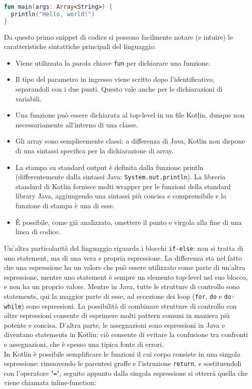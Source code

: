 \begin{lstlisting}[caption={Hello World}, captionpos=b, label={lst:exampleHelloWorld}, language=Kotlin]
fun main(args: Array<String>) {
  println("Hello, world!")
}
\end{lstlisting}

Da questo primo snippet di codice si possono facilmente notare (e intuire) le caratteristiche sintattiche principali del linguaggio:
\begin{itemize}
  \item Viene utilizzata la parola chiave \texttt{fun} per dichiarare una funzione.
  \item Il tipo del parametro in ingresso viene scritto dopo l’identificativo, separandoli con i due punti. Questo vale anche per le dichiarazioni di variabili.
  \item Una funzione può essere dichiarata al top-level in un file Kotlin, dunque non necessariamente all’interno di una classe.
  \item Gli array sono semplicemente classi: a differenza di Java, Kotlin non dispone di una sintassi specifica per la dichiarazione di array.
  \item La stampa su standard output è definita dalla funzione println (differentemente dalla sintassi Java: \texttt{System.out.println}). La libreria standard di Kotlin fornisce molti wrapper per le funzioni della standard library Java, aggiungendo una sintassi più concisa e comprensibile e la funzione di stampa è una di esse.
  \item È possibile, come già analizzato, omettere il punto e virgola alla fine di una linea di codice.
\end{itemize}

Un’altra particolarità del linguaggio riguarda i blocchi \texttt{if-else}: non si tratta di uno statement, ma di una vera e propria espressione. La differenza sta nel fatto che una espressione ha un valore che può
essere utilizzato come parte di un'altra espressione, mentre uno statement è sempre un elemento top-level nel suo blocco, e non ha un proprio valore. Mentre in Java, tutte le strutture di controllo sono statements, qui la maggior parte di esse, ad eccezione dei loop (\texttt{for}, \texttt{do} e \texttt{do-while}) sono espressioni.
La possibilità di combinare strutture di controllo con altre espressioni consente di esprimere molti pattern comuni in maniera più potente e concisa. D'altra parte, le assegnazioni sono espressioni in Java e diventano statements in Kotlin: ciò consente di evitare la confusione tra confronti e assegnazioni, che è spesso una tipica fonte di errori.\\
In Kotlin è possibile semplificare le funzioni il cui corpo consiste in una singola espressione: rimuovendo le parentesi graffe e l'istruzione \texttt{return}, e sostituendoli con l'operatore "\texttt{=}", seguito appunto dalla singola espressione si otterrà quella che viene chiamata inline-function:

